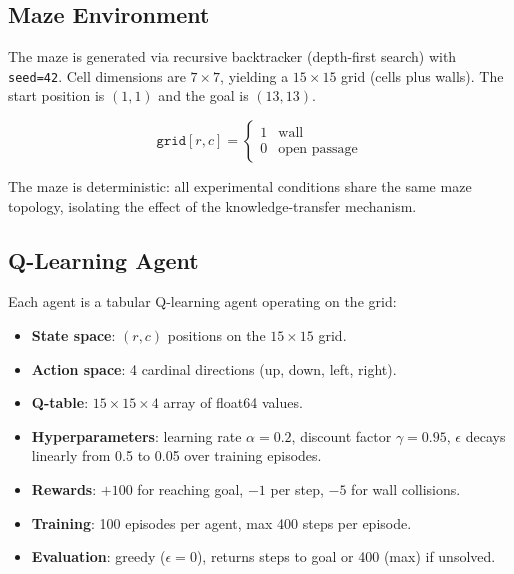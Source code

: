 \documentclass[twoside,11pt]{article}
\begin{document}
\subsection{Maze Environment}
\label{sec:architecture:maze}

The maze is generated via recursive backtracker (depth-first search) with
\texttt{seed=42}.  Cell dimensions are $7 \times 7$, yielding a
$15 \times 15$ grid (cells plus walls).  The start position is $(1, 1)$ and
the goal is $(13, 13)$.

\begin{equation}
\label{eq:maze}
\texttt{grid}[r, c] =
\begin{cases}
1 & \text{wall} \\
0 & \text{open passage}
\end{cases}
\end{equation}

The maze is deterministic: all experimental conditions share the same maze
topology, isolating the effect of the knowledge-transfer mechanism.

\subsection{Q-Learning Agent}
\label{sec:architecture:agent}

Each agent is a tabular Q-learning agent operating on the grid:

\begin{itemize}[leftmargin=2em]
    \item \textbf{State space}: $(r, c)$ positions on the $15 \times 15$ grid.
    \item \textbf{Action space}: 4 cardinal directions (up, down, left, right).
    \item \textbf{Q-table}: $15 \times 15 \times 4$ array of float64 values.
    \item \textbf{Hyperparameters}: learning rate $\alpha = 0.2$, discount
          factor $\gamma = 0.95$, $\epsilon$ decays linearly from 0.5 to 0.05
          over training episodes.
    \item \textbf{Rewards}: $+100$ for reaching goal, $-1$ per step, $-5$
          for wall collisions.
    \item \textbf{Training}: 100 episodes per agent, max 400 steps per
          episode.
    \item \textbf{Evaluation}: greedy ($\epsilon = 0$), returns steps to goal
          or 400 (max) if unsolved.
\end{itemize}
\end{document}
